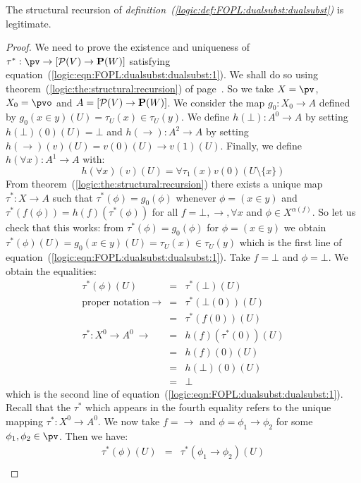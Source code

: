 \begin{prop}\label{logic:prop:FOPL:dualsubst:recursion}
The structural recursion of {\em
definition~(\ref{logic:def:FOPL:dualsubst:dualsubst})} is
legitimate.
\end{prop}
\begin{proof}
We need to prove the existence and uniqueness of
$\tau^{*}:\pv\to[{\cal P}(V)\to{\bf P}(W)]$ satisfying
equation~(\ref{logic:eqn:FOPL:dualsubst:dualsubst:1}). We shall do
so using theorem~(\ref{logic:the:structural:recursion}) of
page~\pageref{logic:the:structural:recursion}. So we take $X=\pv$,
$X_{0}=\pvo$ and $A=[{\cal P}(V)\to{\bf P}(W)]$. We consider the map
$g_{0}:X_{0}\to A$ defined by $g_{0}(x\in
y)(U)=\tau_{U}(x)\in\tau_{U}(y)$. We define $h(\bot):A^{0}\to A$ by
setting $h(\bot)(0)(U)=\bot$ and $h(\to):A^{2}\to A$ by setting
$h(\to)(v)(U)=v(0)(U)\to v(1)(U)$. Finally, we define $h(\forall
x):A^{1}\to A$ with:
    \[
    h(\forall x)(v)(U)=\forall\tau_{1}(x)v(0)(U\setminus\{x\})
    \]
From theorem~(\ref{logic:the:structural:recursion}) there exists a
unique map $\tau^{*}:X\to A$ such that $\tau^{*}(\phi)=g_{0}(\phi)$
whenever $\phi=(x\in y)$ and
$\tau^{*}(f(\phi))=h(f)(\tau^{*}(\phi))$ for all $f=\bot,\to,\forall
x$ and $\phi\in X^{\alpha(f)}$. So let us check that this works:
from $\tau^{*}(\phi)=g_{0}(\phi)$ for $\phi=(x\in y)$ we obtain
$\tau^{*}(\phi)(U)=g_{0}(x\in y)(U)=\tau_{U}(x)\in\tau_{U}(y)$ which
is the first line of
equation~(\ref{logic:eqn:FOPL:dualsubst:dualsubst:1}). Take $f=\bot$
and $\phi=\bot$. We obtain the equalities:
    \begin{eqnarray*}
    \tau^{*}(\phi)(U)&=&\tau^{*}(\bot)(U)\\
    \mbox{proper notation}\ \rightarrow
    &=&\tau^{*}(\bot(0))(U)\\
    &=&\tau^{*}(f(0))(U)\\
    \tau^{*}:X^{0}\to A^{0}\ \rightarrow
    &=&h(f)(\tau^{*}(0))(U)\\
    &=&h(f)(0)(U)\\
    &=&h(\bot)(0)(U)\\
    &=&\bot
    \end{eqnarray*}
which is the second line of
equation~(\ref{logic:eqn:FOPL:dualsubst:dualsubst:1}). Recall that
the $\tau^{*}$ which appears in the fourth equality refers to the
unique mapping $\tau^{*}:X^{0}\to A^{0}$. We now take $f=\to$ and
$\phi=\phi_{1}\to\phi_{2}$ for some $\phi_{1},\phi_{2}\in\pv$. Then
we have:
    \begin{eqnarray*}
    \tau^{*}(\phi)(U)&=&\tau^{*}(\phi_{1}\to\phi_{2})(U)\\

\end{eqnarray*}
\end{proof}
